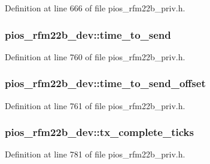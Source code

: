 Definition at line 666 of file pios\-\_\-rfm22b\-\_\-priv.\-h.

\hypertarget{structpios__rfm22b__dev_a2ab6b40e08577ff473d6a462f6e9ba47}{
\subsubsection[{time\-\_\-to\-\_\-send}]{ pios\-\_\-rfm22b\-\_\-dev\-::time\-\_\-to\-\_\-send}}\label{structpios__rfm22b__dev_a2ab6b40e08577ff473d6a462f6e9ba47}


Definition at line 760 of file pios\-\_\-rfm22b\-\_\-priv.\-h.

\hypertarget{structpios__rfm22b__dev_ad552e65c59e3873f29312042109562cd}{
\subsubsection[{time\-\_\-to\-\_\-send\-\_\-offset}]{ pios\-\_\-rfm22b\-\_\-dev\-::time\-\_\-to\-\_\-send\-\_\-offset}}\label{structpios__rfm22b__dev_ad552e65c59e3873f29312042109562cd}


Definition at line 761 of file pios\-\_\-rfm22b\-\_\-priv.\-h.

\hypertarget{structpios__rfm22b__dev_af71e33856164ba7654a523173441ecb3}{
\subsubsection[{tx\-\_\-complete\-\_\-ticks}]{ pios\-\_\-rfm22b\-\_\-dev\-::tx\-\_\-complete\-\_\-ticks}}\label{structpios__rfm22b__dev_af71e33856164ba7654a523173441ecb3}


Definition at line 781 of file pios\-\_\-rfm22b\-\_\-priv.\-h.

